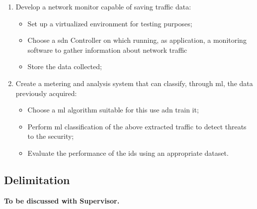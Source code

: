 \begin{enumerate}
    \item Develop a network monitor capable of saving traffic data:
    \begin{itemize}
        \item[\faCaretRight] Set up a virtualized environment for testing purposes;
        \item[\faCaretRight] Choose a \gls{sdn} Controller on which running, as application, a monitoring software to gather information about network traffic
        \item[\faCaretRight] Store the data collected;
    \end{itemize}
    \item Create a metering and analysis system that can classify, through \gls{ml}, the data previously acquired:
    \begin{itemize}
        \item[\faCaretRight] Choose a \gls{ml} algorithm suitable for this use adn train it;
        \item[\faCaretRight] Perform \gls{ml} classification of the above extracted traffic to detect threats to the security;
        \item[\faCaretRight] Evaluate the performance of the \gls{ids} using an appropriate dataset.
    \end{itemize}
\end{enumerate}


\subsection{Delimitation}
\label{subsec:delimitation}

\faEdit \quad \textbf{To be discussed with Supervisor.} \\

\textcolor{dimgray}{\lipsum[1-2]}

